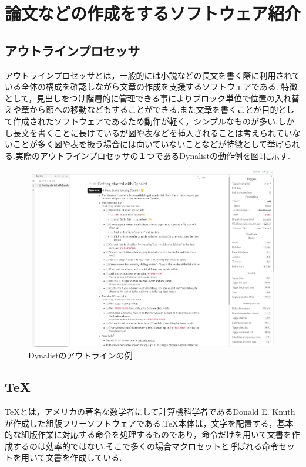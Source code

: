 \documentclass[a4j,12pt]{jarticle}
\begin{document}
\newpage

\section{論文などの作成をするソフトウェア紹介}
\subsection{アウトラインプロセッサ}
アウトラインプロセッサとは，一般的には小説などの長文を書く際に利用されている全体の構成を確認しながら文章の作成を支援するソフトウェアである.
特徴として，見出しをつけ階層的に管理できる事によりブロック単位で位置の入れ替えや章から節への移動などもすることができる.また文章を書くことが目的として作成されたソフトウェアであるため動作が軽く，シンプルなものが多い.しかし長文を書くことに長けているが図や表などを挿入されることは考えられていないことが多く図や表を扱う場合には向いていないことなどが特徴として挙げられる.実際のアウトラインプロセッサの１つであるDynalistの動作例を図\ref{fig:b}に示す.
\begin{figure}[H]
\begin{center}
 \includegraphics[clip,width=130mm,height=80mm]{figure/Dynalist.png}
 \end{center}
 \caption{Dynalistのアウトラインの例}
 \label{fig:b}
\end{figure}
\newpage
\subsection{\TeX}
\TeX とは，アメリカの著名な数学者にして計算機科学者であるDonald E. Knuthが作成した組版フリーソフトウェアである.TeX本体は，文字を配置する，基本的な組版作業に対応する命令を処理するものであり，命令だけを用いて文書を作成するのは効率的ではない.そこで多くの場合マクロセットと呼ばれる命令セットを用いて文書を作成している.
\end{document}
